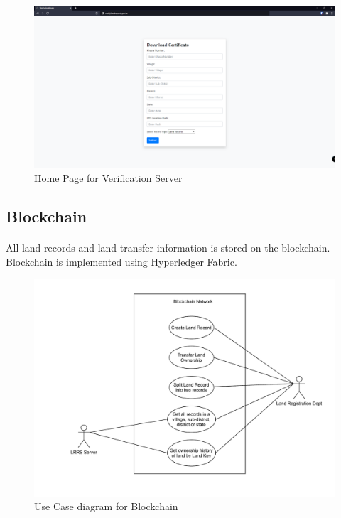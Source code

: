 \documentclass[12pt]{article}
\begin{document}
        \begin{figure}[H]
                \includegraphics[scale=0.25]{verification_home.png}
                \centering
                \caption{Home Page for Verification Server}
        \end{figure}

    \subsection{Blockchain}
        \paragraph{}
        All land records and land transfer information is stored on the blockchain. Blockchain is implemented using Hyperledger Fabric.

        \begin{figure}[H]
            \includegraphics[scale=0.25]{blockchain_use_cases}
            \centering
            \caption{Use Case diagram for Blockchain}
            \label{fig:bl_use_case}
        \end{figure}
\end{document}

